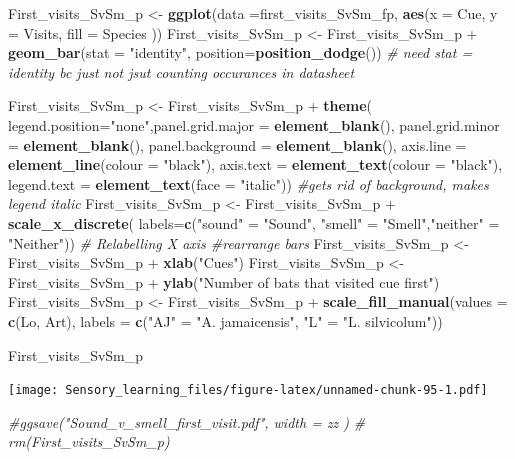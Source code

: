 \documentclass[]{article}
\newenvironment{Shaded}{\begin{snugshade}}{\end{snugshade}}
\newcommand{\KeywordTok}[1]{\textcolor[rgb]{0.13,0.29,0.53}{\textbf{{#1}}}}
\newcommand{\DataTypeTok}[1]{\textcolor[rgb]{0.13,0.29,0.53}{{#1}}}
\newcommand{\StringTok}[1]{\textcolor[rgb]{0.31,0.60,0.02}{{#1}}}
\newcommand{\CommentTok}[1]{\textcolor[rgb]{0.56,0.35,0.01}{\textit{{#1}}}}
\newcommand{\NormalTok}[1]{{#1}}
\begin{document}
\begin{Shaded}
\begin{Highlighting}[]
\NormalTok{First_visits_SvSm_p <-}\StringTok{ }\KeywordTok{ggplot}\NormalTok{(}\DataTypeTok{data =}\NormalTok{first_visits_SvSm_fp, }\KeywordTok{aes}\NormalTok{(}\DataTypeTok{x =} \NormalTok{Cue, }\DataTypeTok{y =} \NormalTok{Visits, }\DataTypeTok{fill =} \NormalTok{Species ))}
\NormalTok{First_visits_SvSm_p <-}\StringTok{ }\NormalTok{First_visits_SvSm_p +}\StringTok{ }\KeywordTok{geom_bar}\NormalTok{(}\DataTypeTok{stat =} \StringTok{"identity"}\NormalTok{, }\DataTypeTok{position=}\KeywordTok{position_dodge}\NormalTok{()) }\CommentTok{# need stat = identity bc just not jsut counting occurances in datasheet}

\NormalTok{First_visits_SvSm_p  <-}\StringTok{ }\NormalTok{First_visits_SvSm_p  +}\StringTok{  }\KeywordTok{theme}\NormalTok{( }\DataTypeTok{legend.position=}\StringTok{"none"}\NormalTok{,}\DataTypeTok{panel.grid.major =} \KeywordTok{element_blank}\NormalTok{(), }\DataTypeTok{panel.grid.minor =} \KeywordTok{element_blank}\NormalTok{(),}
\DataTypeTok{panel.background =} \KeywordTok{element_blank}\NormalTok{(), }\DataTypeTok{axis.line =} \KeywordTok{element_line}\NormalTok{(}\DataTypeTok{colour =} \StringTok{"black"}\NormalTok{), }\DataTypeTok{axis.text =} \KeywordTok{element_text}\NormalTok{(}\DataTypeTok{colour =} \StringTok{"black"}\NormalTok{),  }\DataTypeTok{legend.text =} \KeywordTok{element_text}\NormalTok{(}\DataTypeTok{face =} \StringTok{"italic"}\NormalTok{))  }\CommentTok{#gets rid of background, makes legend italic}
\NormalTok{First_visits_SvSm_p  <-}\StringTok{ }\NormalTok{First_visits_SvSm_p  +}\StringTok{ }\KeywordTok{scale_x_discrete}\NormalTok{( }\DataTypeTok{labels=}\KeywordTok{c}\NormalTok{(}\StringTok{"sound"} \NormalTok{=}\StringTok{ "Sound"}\NormalTok{, }\StringTok{"smell"} \NormalTok{=}\StringTok{ "Smell"}\NormalTok{,}\StringTok{"neither"} \NormalTok{=}\StringTok{ "Neither"}\NormalTok{))  }\CommentTok{# Relabelling X axis #rearrange bars}
\NormalTok{First_visits_SvSm_p  <-}\StringTok{ }\NormalTok{First_visits_SvSm_p  +}\StringTok{ }\KeywordTok{xlab}\NormalTok{(}\StringTok{"Cues"}\NormalTok{)}
\NormalTok{First_visits_SvSm_p  <-}\StringTok{ }\NormalTok{First_visits_SvSm_p  +}\StringTok{ }\KeywordTok{ylab}\NormalTok{(}\StringTok{"Number of bats that visited cue first"}\NormalTok{)}
\NormalTok{First_visits_SvSm_p  <-}\StringTok{ }\NormalTok{First_visits_SvSm_p  +}\StringTok{ }\KeywordTok{scale_fill_manual}\NormalTok{(}\DataTypeTok{values =} \KeywordTok{c}\NormalTok{(Lo, Art), }\DataTypeTok{labels =} \KeywordTok{c}\NormalTok{(}\StringTok{"AJ"} \NormalTok{=}\StringTok{ "A. jamaicensis"}\NormalTok{, }\StringTok{"L"} \NormalTok{=}\StringTok{ "L. silvicolum"}\NormalTok{))}

\NormalTok{First_visits_SvSm_p}
\end{Highlighting}
\end{Shaded}

\texttt{[image: Sensory\_learning\_files/figure-latex/unnamed-chunk-95-1.pdf]}

\begin{Shaded}
\begin{Highlighting}[]
  \CommentTok{#ggsave("Sound_v_smell_first_visit.pdf", width = zz  )}
 \CommentTok{# rm(First_visits_SvSm_p)}
\end{Highlighting}
\end{Shaded}
\end{document}
